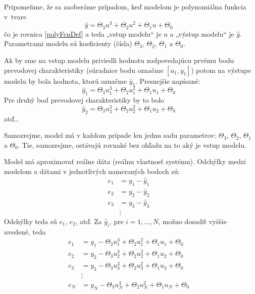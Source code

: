 \documentclass[a4paper, 10pt, ]{article}
\begin{document}
\bigskip

Pripomeňme, že sa zaoberáme prípadom, keď modelom je polynomiálna funkcia v~tvare
\begin{equation}
    \hat y = \Theta_3 u^3 + \Theta_2 u^2 + \Theta_1 u + \Theta_0
\end{equation}
čo je rovnica \eqref{polyFcnDef} a teda „vstup modelu“ je $u$ a „výstup modelu“ je $\hat y$. Parametrami modelu sú koeficienty (čísla) $\Theta_3$, $\Theta_2$, $\Theta_1$ a $\Theta_0$.


Ak by sme na vstup modelu priviedli hodnotu zodpovedajúcu prvému bodu prevodovej charakteristiky (súradnice bodu označme $[u_1, y_1]$) potom na výstupe modelu by bola hodnota, ktorú označme $\hat y_1$. Presnejšie napísané:
\begin{equation}
    \hat y_1 = \Theta_3 u_1^3 + \Theta_2 u_1^2 + \Theta_1 u_1 + \Theta_0
\end{equation}
Pre druhý bod prevodovej charakteristiky by to bolo
\begin{equation}
    \hat y_2 = \Theta_3 u_2^3 + \Theta_2 u_2^2 + \Theta_1 u_2 + \Theta_0
\end{equation}
atď\ldots

Samozrejme, model má v každom prípade len jednu sadu parametrov: $\Theta_3$, $\Theta_2$, $\Theta_1$ a $\Theta_0$. Tie, samozrejme, ostávajú rovnaké bez ohľadu na to aký je vstup modelu.




Model má aproximovať reálne dáta (reálnu vlastnosť systému). Odchýlky medzi modelom a dátami v jednotlivých nameraných bodoch sú:
\begin{subequations}
    \begin{align}
        e_1 &= y_1 - \hat y_1 \\
        e_2 &= y_2 - \hat y_2 \\
        e_3 &= y_3 - \hat y_3 \\
        &\vdots
    \end{align}
\end{subequations}
Odchýlky teda sú $e_1$, $e_2$, atď. Za $\hat y_i$, pre $i = 1,\ldots, N$, možno dosadiť vyššie uvedené, teda
\begin{subequations}
    \begin{align}
        e_1 &= y_1 - \Theta_3 u_1^3 + \Theta_2 u_1^2 + \Theta_1 u_1 + \Theta_0 \\
        e_2 &= y_2 - \Theta_3 u_2^3 + \Theta_2 u_2^2 + \Theta_1 u_2 + \Theta_0 \\
        e_3 &= y_3 - \Theta_3 u_3^3 + \Theta_2 u_3^2 + \Theta_1 u_3 + \Theta_0 \\
        &\vdots \\
        e_N &= y_N - \Theta_3 u_N^3 + \Theta_2 u_N^2 + \Theta_1 u_N + \Theta_0
    \end{align}
\end{subequations}
\end{document}
